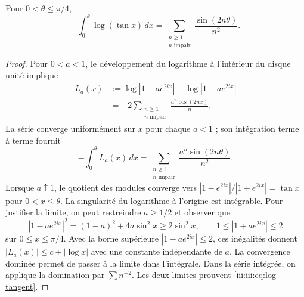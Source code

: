 \begin{lemma}
\label{iii:iii:lem:log-tangent}
Pour $0<\theta\leq\pi/4$,
\begin{equation}
 -\int_0^\theta\log(\tan x)\,dx
 =\sum_{\substack{n\geq1\\n\text{ impair}}}
      \frac{\sin(2n\theta)}{n^2}.
 \label{iii:iii:eq:log-tangent}
\end{equation}
\end{lemma}
\begin{proof}
Pour $0<a<1$, le développement du logarithme à l’intérieur du disque unité implique
\begin{align*}
 L_a(x)
 &:=\log|1-ae^{2ix}|-\log|1+ae^{2ix}|\\
 &=-2\sum_{\substack{n\geq1\\n\text{ impair}}}
       \frac{a^n\cos(2nx)}{n}.
\end{align*}
La série converge uniformément sur $x$ pour chaque $a<1$ ; son intégration
terme à terme fournit
\[
 -\int_0^\theta L_a(x)\,dx
 =\sum_{\substack{n\geq1\\n\text{ impair}}}
       \frac{a^n\sin(2n\theta)}{n^2}.
\]
Lorsque $a\uparrow1$, le quotient des modules converge vers
$|1-e^{2ix}|/|1+e^{2ix}|=\tan x$ pour $0<x\leq\theta$.
La singularité du logarithme à l’origine est intégrable. Pour justifier
la limite, on peut restreindre $a\geq1/2$ et observer que
\[
 |1-ae^{2ix}|^2=(1-a)^2+4a\sin^2x
 \geq2\sin^2x,
 \qquad 1\leq|1+ae^{2ix}|\leq2
\]
sur $0\leq x\leq\pi/4$. Avec la borne supérieure
$|1-ae^{2ix}|\leq2$, ces inégalités donnent
$|L_a(x)|\leq c+|\log x|$ avec une constante indépendante de $a$.
La convergence dominée permet de passer à la limite dans l’intégrale.
Dans la série intégrée, on applique la domination par $\sum n^{-2}$.
Les deux limites prouvent \eqref{iii:iii:eq:log-tangent}.
\end{proof}

